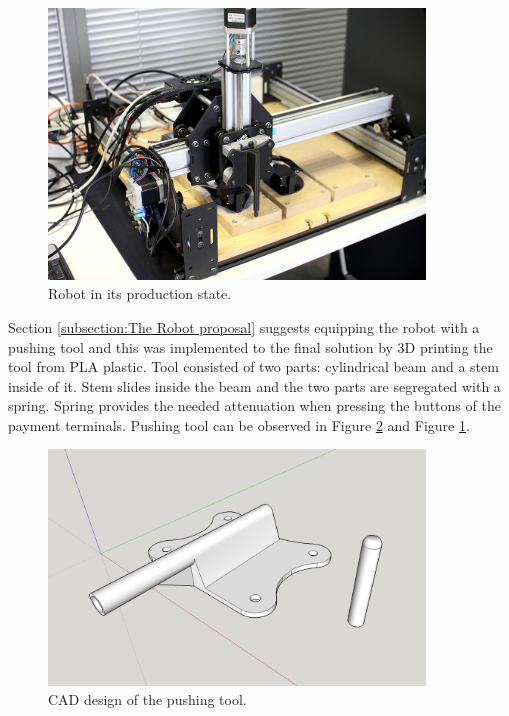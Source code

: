 \begin{figure}[ht]
  \begin{center}
    \includegraphics[width=10cm]{images/robot.jpg}
    \caption{Robot in its production state.}
    \label{fig:robot_final}
  \end{center}
\end{figure}
\FloatBarrier

Section \ref{subsection:The Robot proposal} suggests equipping the robot with a pushing tool and this was implemented to the final solution by 3D printing the tool from PLA plastic. Tool consisted of two parts: cylindrical beam and a stem inside of it. Stem slides inside the beam and the two parts are segregated with a spring. Spring provides the needed attenuation when pressing the buttons of the payment terminals. Pushing tool can be observed in Figure \ref{fig:pushing_tool} and Figure \ref{fig:robot_final}.

\begin{figure}[ht]
  \begin{center}
    \includegraphics[width=10cm]{images/pushing_tool.png}
    \caption{CAD design of the pushing tool.}
    \label{fig:pushing_tool}
  \end{center}
\end{figure}
\FloatBarrier

